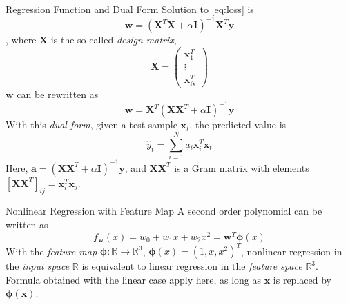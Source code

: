 \documentclass[aspectratio=169]{beamer}
\begin{document}
\begin{frame}{Regression Function and Dual Form}
\scriptsize
Solution to \ref{eq:loss} is
\begin{equation}
\mathbf{w}=(\mathbf{X}^T\mathbf{X}+\alpha\mathbf{I})^{-1}\mathbf{X}^T\mathbf{y}
\end{equation}
, where $\mathbf{X}$ is the so called \emph{design matrix}, 
\begin{equation}
  \mathbf{X}=\begin{pmatrix}\mathbf{x}_1^T \\ \vdots \\ \mathbf{x}_N^T \end{pmatrix}
\end{equation}
$\mathbf{w}$ can be rewritten as
\begin{equation}
\mathbf{w}=\mathbf{X}^T(\mathbf{X}\mathbf{X}^T+\alpha\mathbf{I})^{-1}\mathbf{y}
\end{equation}
With this \emph{dual form}, given a test sample $\mathbf{x}_t$, the predicted value is
\begin{equation}
\hat{y}_t=\sum_{i=1}^{N}a_i\mathbf{x}_i^T\mathbf{x}_t
\end{equation} \label{eq:sol}
Here, $\mathbf{a}=(\mathbf{X}\mathbf{X}^T+\alpha\mathbf{I})^{-1}\mathbf{y}$, and $\mathbf{X}\mathbf{X}^T$ is a Gram matrix with elements $[\mathbf{X}\mathbf{X}^T]_{ij}=\mathbf{x}_i^T\mathbf{x}_j$.
\end{frame}

\begin{frame}{Nonlinear Regression with Feature Map}
A second order polynomial can be written as
\begin{equation}
f_\mathbf{w}(x)=w_0+w_1x+w_2x^2=\mathbf{w}^T\bm{\phi}(x)
\end{equation}
With the \emph{feature map} $\bm{\phi}:\mathbb{R}\rightarrow\mathbb{R}^3$, $\bm{\phi}(x)=(1,x,x^2)^T$, nonlinear regression in the \emph{input space} $\mathbb{R}$ is equivalent to linear regression in the \emph{feature space} $\mathbb{R}^3$. \\
Formula obtained with the linear case apply here, as long as $\mathbf{x}$ is replaced by $\bm{\phi}(\mathbf{x})$.
\end{frame}
\end{document}

